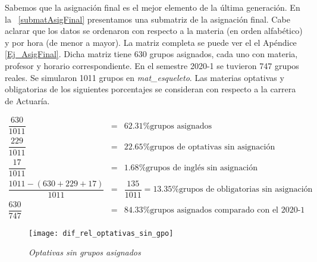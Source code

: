 


Sabemos que la asignación final es el mejor elemento de la última generación. En la \tablename{~\ref{submatAsigFinal}} presentamos una submatriz de la asignación final. Cabe aclarar que los datos se ordenaron con respecto a la materia (en orden alfabético) y por hora (de menor a mayor). La matriz completa se puede ver el el Apéndice \ref{Ej_AsigFinal}. Dicha matriz tiene 630 grupos asignados, cada uno con materia, profesor y horario correspondiente. En el semestre 2020-1 se tuvieron 747 grupos reales. Se simularon 1011 grupos en \textit{mat\_esqueleto}. Las materias optativas y obligatorias de los siguientes porcentajes se consideran con respecto a la carrera de Actuaría.

\begin{eqnarray*}
\dfrac{630}{1011} &=& 62.31\% \text{grupos asignados}\\
\dfrac{229}{1011} &=& 22.65\% \text{grupos de optativas sin asignación}\\
\dfrac{17}{1011} &=& 1.68\% \text{grupos de inglés sin asignación}\\
\dfrac{1011 - (630 + 229 + 17)}{1011} &=& \dfrac{135}{1011} = 13.35\% \text{grupos de obligatorias sin asignación}\\
\dfrac{630}{747} &=& 84.33\% \text{grupos asignados comparado con el 2020-1}
\end{eqnarray*}

\begin{figure}[H]
\centering
\texttt{[image: dif\_rel\_optativas\_sin\_gpo]} %
\caption[\textit{Optativas sin grupos asignados}]{\textit{Optativas sin grupos asignados}}
\end{figure}


